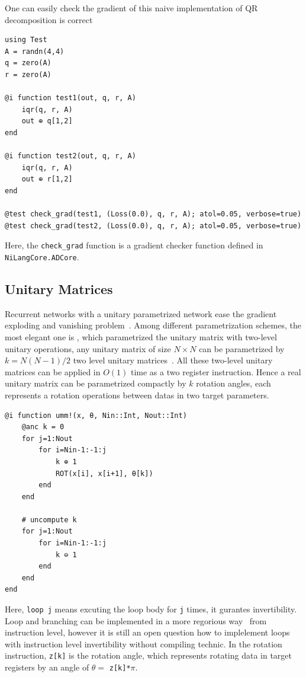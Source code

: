 \documentclass[aps,twocolumn,longbibliography,english,superscriptaddress,prr]{revtex4-1}
\newcommand{\<}{\langle}
\renewcommand{\>}{\rangle}
\begin{document}
One can easily check the gradient of this naive implementation of QR decomposition is correct
\begin{minipage}{.44\textwidth}
\begin{lstlisting}
using Test
A = randn(4,4)
q = zero(A)
r = zero(A)

@i function test1(out, q, r, A)
    iqr(q, r, A)
    out ⊕ q[1,2]
end

@i function test2(out, q, r, A)
    iqr(q, r, A)
    out ⊕ r[1,2]
end

@test check_grad(test1, (Loss(0.0), q, r, A); atol=0.05, verbose=true)
@test check_grad(test2, (Loss(0.0), q, r, A); atol=0.05, verbose=true)
\end{lstlisting}
\end{minipage}

Here, the \texttt{check\_grad} function is a gradient checker function defined in \texttt{NiLangCore.ADCore}.

\subsection{Unitary Matrices}
Recurrent networks with a unitary parametrized network ease the gradient exploding and vanishing problem~\cite{Arjovsky2015,Wisdom2016,Li2016}.
Among different parametrization schemes, the most elegant one is \cite{Li2016}, which parametrized the unitary matrix with two-level unitary operations, any unitary matrix of size $N\times N$ can be parametrized by $k = N(N-1)/2$ two level unitary matrices~\cite{Li2013}. All these two-level unitary matrices can be applied in $O(1)$ time as a two register instruction.
Hence a real unitary matrix can be parametrized compactly by $k$ rotation angles, each represents a rotation operations between datas in two target parameters.


\begin{minipage}{.44\textwidth}
\begin{lstlisting}[basicstyle=\small\ttfamily,columns=fullflexible]
@i function umm!(x, θ, Nin::Int, Nout::Int)
    @anc k = 0
    for j=1:Nout
        for i=Nin-1:-1:j
            k ⊕ 1
            ROT(x[i], x[i+1], θ[k])
        end
    end

    # uncompute k
    for j=1:Nout
        for i=Nin-1:-1:j
            k ⊖ 1
        end
    end
end
\end{lstlisting}
\end{minipage}

Here, \texttt{loop j} means excuting the loop body for \texttt{j} times, it gurantes invertibility.
Loop and branching can be implemented in a more regorious way~\cite{Vieri1999} from instruction level,
however it is still an open question how to implelement loops with instruction level invertibility without compiling technic.
In the rotation instruction, \texttt{z[k]} is the rotation angle, which represents rotating data in target registers by an angle of $\theta=$ \texttt{z[k]*$\pi$}.
\end{document}
